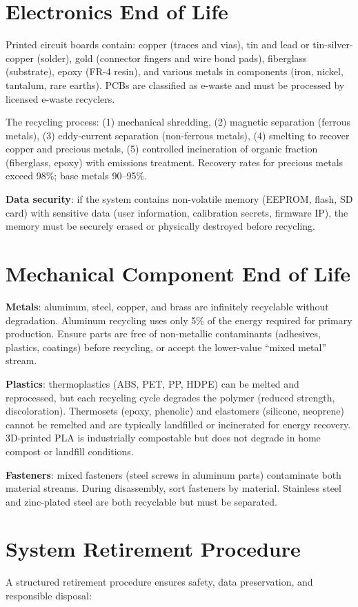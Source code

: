 \section{Electronics End of Life}
Printed circuit boards contain: copper (traces and vias), tin and lead or tin-silver-copper (solder), gold (connector fingers and wire bond pads), fiberglass (substrate), epoxy (FR-4 resin), and various metals in components (iron, nickel, tantalum, rare earths). PCBs are classified as e-waste and must be processed by licensed e-waste recyclers.

The recycling process: (1) mechanical shredding, (2) magnetic separation (ferrous metals), (3) eddy-current separation (non-ferrous metals), (4) smelting to recover copper and precious metals, (5) controlled incineration of organic fraction (fiberglass, epoxy) with emissions treatment. Recovery rates for precious metals exceed 98\%; base metals 90--95\%.

\textbf{Data security}: if the system contains non-volatile memory (EEPROM, flash, SD card) with sensitive data (user information, calibration secrets, firmware IP), the memory must be securely erased or physically destroyed before recycling.

\section{Mechanical Component End of Life}
\textbf{Metals}: aluminum, steel, copper, and brass are infinitely recyclable without degradation. Aluminum recycling uses only 5\% of the energy required for primary production. Ensure parts are free of non-metallic contaminants (adhesives, plastics, coatings) before recycling, or accept the lower-value ``mixed metal'' stream.

\textbf{Plastics}: thermoplastics (ABS, PET, PP, HDPE) can be melted and reprocessed, but each recycling cycle degrades the polymer (reduced strength, discoloration). Thermosets (epoxy, phenolic) and elastomers (silicone, neoprene) cannot be remelted and are typically landfilled or incinerated for energy recovery. 3D-printed PLA is industrially compostable but does not degrade in home compost or landfill conditions.

\textbf{Fasteners}: mixed fasteners (steel screws in aluminum parts) contaminate both material streams. During disassembly, sort fasteners by material. Stainless steel and zinc-plated steel are both recyclable but must be separated.

\section{System Retirement Procedure}
A structured retirement procedure ensures safety, data preservation, and responsible disposal:

